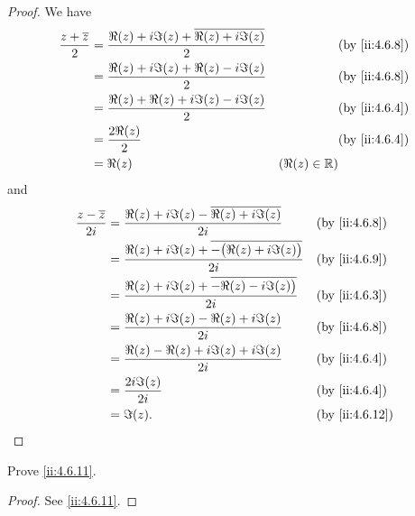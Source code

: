 \begin{proof}
  We have
  \begin{align*}
    \dfrac{z + \overline{z}}{2} & = \dfrac{\Re(z) + i \Im(z) + \overline{\Re(z) + i \Im(z)}}{2} &                 & \by{ii:4.6.8} \\
                                & = \dfrac{\Re(z) + i \Im(z) + \Re(z) - i \Im(z)}{2}            &                 & \by{ii:4.6.8} \\
                                & = \dfrac{\Re(z) + \Re(z) + i \Im(z) - i \Im(z)}{2}            &                 & \by{ii:4.6.4} \\
                                & = \dfrac{2 \Re(z)}{2}                                         &                 & \by{ii:4.6.4} \\
                                & = \Re(z)                                                      & (\Re(z) \in \R)
  \end{align*}
  and
  \begin{align*}
    \dfrac{z - \overline{z}}{2i} & = \dfrac{\Re(z) + i \Im(z) - \overline{\Re(z) + i \Im(z)}}{2i}            &  & \by{ii:4.6.8}  \\
                                 & = \dfrac{\Re(z) + i \Im(z) + \overline{-\big(\Re(z) + i \Im(z)\big)}}{2i} &  & \by{ii:4.6.9}  \\
                                 & = \dfrac{\Re(z) + i \Im(z) + \overline{-\Re(z) - i \Im(z)\big)}}{2i}      &  & \by{ii:4.6.3}  \\
                                 & = \dfrac{\Re(z) + i \Im(z) - \Re(z) + i \Im(z)}{2i}                       &  & \by{ii:4.6.8}  \\
                                 & = \dfrac{\Re(z) - \Re(z) + i \Im(z) + i \Im(z)}{2i}                       &  & \by{ii:4.6.4}  \\
                                 & = \dfrac{2i \Im(z)}{2i}                                                   &  & \by{ii:4.6.4}  \\
                                 & = \Im(z).                                                                 &  & \by{ii:4.6.12}
  \end{align*}
\end{proof}

\begin{ex}\label{ii:ex:4.6.6}
  Prove \cref{ii:4.6.11}.
\end{ex}

\begin{proof}
  See \cref{ii:4.6.11}.
\end{proof}


